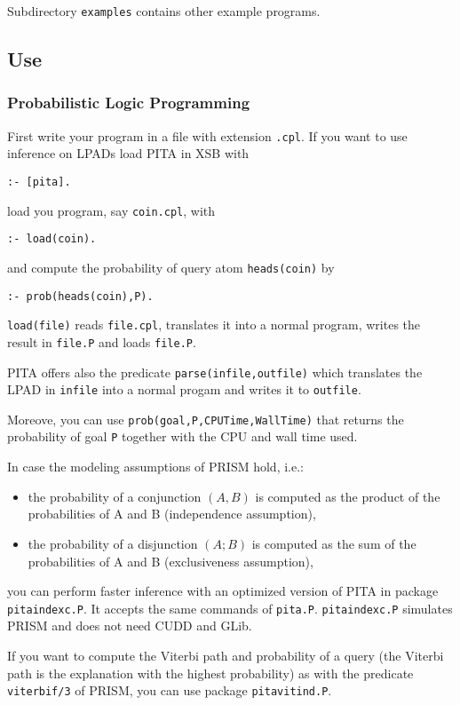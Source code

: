 Subdirectory \texttt{examples} contains other example programs.

\subsection{Use}
\subsubsection{Probabilistic Logic Programming}
First write your program in a file with extension \texttt{.cpl}.
If you want to use inference on LPADs load PITA in XSB with
\begin{verbatim}
:- [pita].
\end{verbatim}
load you program, say \texttt{coin.cpl}, with 
\begin{verbatim}
:- load(coin).
\end{verbatim}
and compute the probability of query atom \texttt{heads(coin)} by
\begin{verbatim}
:- prob(heads(coin),P).
\end{verbatim} 
%
\texttt{load(file)} reads \texttt{file.cpl}, translates it into a normal  program, writes the result in \texttt{file.P} and loads \texttt{file.P}.

PITA offers also the predicate \texttt{parse(infile,outfile)} which translates the LPAD in \texttt{infile} into a normal progam and writes it to  \texttt{outfile}.

Moreove, you can use \texttt{prob(goal,P,CPUTime,WallTime)} that returns the probability of goal \texttt{P} together with the CPU and wall time used.

In case the modeling assumptions of PRISM hold, i.e.:
 \begin{itemize}
  \item the probability of a conjunction $(A,B)$ is
computed as the product of the probabilities of A and B (independence assumption),
\item
the probability of a disjunction $(A;B)$ is computed as the sum of
the probabilities of A and B
(exclusiveness assumption),
  \end{itemize}
you can perform faster inference with an optimized version of PITA in package \texttt{pitaindexc.P}. It accepts the same commands of \texttt{pita.P}.  \texttt{pitaindexc.P} simulates PRISM and does not need CUDD and GLib.


If you want to compute the Viterbi path and probability of a query (the Viterbi path is the explanation with the highest probability) as with the predicate \texttt{viterbif/3} of PRISM, you can use package \texttt{pitavitind.P}.

